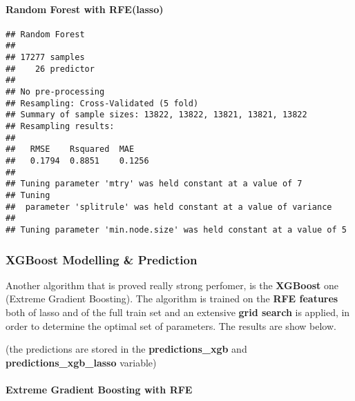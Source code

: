 \documentclass[]{article}
\let\oldparagraph\paragraph
\renewcommand{\paragraph}[1]{\oldparagraph{#1}\mbox{}}
\begin{document}
\hypertarget{random-forest-with-rfelasso}{%
\paragraph{Random Forest with
RFE(lasso)}\label{random-forest-with-rfelasso}}

\begin{verbatim}
## Random Forest 
## 
## 17277 samples
##    26 predictor
## 
## No pre-processing
## Resampling: Cross-Validated (5 fold) 
## Summary of sample sizes: 13822, 13822, 13821, 13821, 13822 
## Resampling results:
## 
##   RMSE    Rsquared  MAE   
##   0.1794  0.8851    0.1256
## 
## Tuning parameter 'mtry' was held constant at a value of 7
## Tuning
##  parameter 'splitrule' was held constant at a value of variance
## 
## Tuning parameter 'min.node.size' was held constant at a value of 5
\end{verbatim}

\hypertarget{xgboost-modelling-prediction}{%
\subsubsection{XGBoost Modelling \&
Prediction}\label{xgboost-modelling-prediction}}

Another algorithm that is proved really strong perfomer, is the
\textbf{XGBoost} one (Extreme Gradient Boosting). The algorithm is
trained on the \textbf{RFE features} both of lasso and of the full train
set and an extensive \textbf{grid search} is applied, in order to
determine the optimal set of parameters. The results are show below.

(the predictions are stored in the \textbf{predictions\_xgb} and
\textbf{predictions\_xgb\_lasso} variable)

\hypertarget{extreme-gradient-boosting-with-rfe}{%
\paragraph{Extreme Gradient Boosting with
RFE}\label{extreme-gradient-boosting-with-rfe}}
\end{document}
